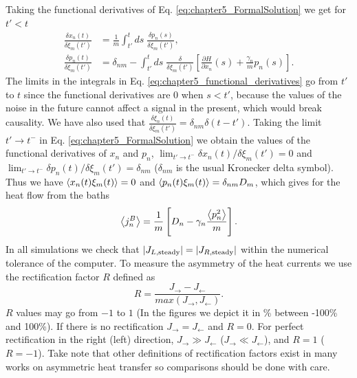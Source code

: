 %
Taking the functional derivatives of Eq. \eqref{eq:chapter5_FormalSolution} we get for $t'<t$
%
\begin{equation}
  \begin{split}
    \frac{\delta x_n(t)}{\delta \xi_m(t')} &= \frac{1}{m}\int_{t'}^{t} ds\; \frac{\delta p_n(s)}{\delta \xi_m(t')},
    \\
    \frac{\delta p_n(t)}{\delta \xi_m(t')} &= \delta_{nm} -\int_{t'}^{t} ds\;\frac{\delta}{\delta \xi_m(t')}\left[\frac{\partial H}{\partial x_n}(s) + \frac{\gamma_n}{m}p_n(s) \right].
  \end{split}
  \label{eq:chapter5_functional_derivatives}
\end{equation}
%
The limits in the integrals in Eq. \eqref{eq:chapter5_functional_derivatives} go from $t'$ to $t$ since the functional derivatives are $0$ when $s<t'$, because the values of the noise in the future cannot affect a signal in the present, which would break causality. We have also used that $\frac{\delta \xi_n(t)}{\delta \xi_m(t')} = \delta_{nm}\delta(t-t')$. Taking the limit $t'\to t^-$ in Eq. \eqref{eq:chapter5_FormalSolution} we obtain the values of the functional derivatives of $x_n$ and $p_n$, $ \lim_{t'\to t^-} \delta x_n(t)/\delta \xi_m(t') = 0$ and $\lim_{t'\to t^-} \delta p_n(t)/\delta \xi_m(t') = \delta_{nm}$ ($\delta_{nm}$ is the usual Kronecker delta symbol). Thus we have $\expval{x_n(t) \xi_m(t)} = 0$ and $\expval{p_n(t) \xi_m(t)} = \delta_{nm}D_m$, which gives for the heat flow from the baths
%
\begin{equation}
    \expval{j^B_n} = \frac{1}{m} \left[ D_n-\gamma_n \frac{\expval{p_n^2}}{m} \right].
    \label{eq:chapter5_BathHeatFlowNovikov}
\end{equation}
%
In all simulations we check that $|J_{L,{\rm steady}}|=|J_{R,{\rm steady}}|$ within the numerical tolerance of the computer. To measure the asymmetry of the heat currents we use the rectification factor $R$ defined as
%
\begin{equation}
    R = \frac{ J_\rightarrow - J_\leftarrow}{max(J_\rightarrow,J_\leftarrow)}.
    \label{eq:chapter5_R_Factor}
\end{equation}
%
$R$ values may go from $-1$ to $1$ (In the figures we depict it in \% between -100\% and 100\%). If there is no rectification $J_\rightarrow = J_\leftarrow $ and $R=0$. For perfect rectification in the right (left) direction, $J_\rightarrow \gg J_\leftarrow$ ($J_\rightarrow \ll J_\leftarrow$), and $R = 1$ ($R = -1$).
Take note that other  definitions of rectification factors exist in many works
on asymmetric heat transfer so comparisons should be done with care.
%

